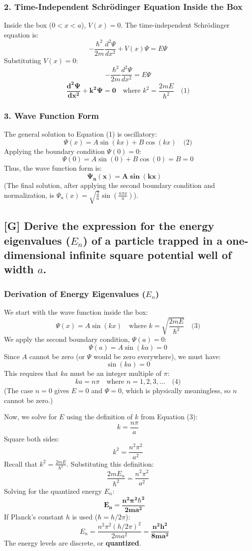 \documentclass[12pt]{article}
\begin{document}
\subsubsection*{2. Time-Independent Schrödinger Equation Inside the Box}
Inside the box ($0 < x < a$), $V(x)=0$. The time-independent Schrödinger equation is:
$$
-\frac{\hbar^2}{2m} \frac{d^2\Psi}{dx^2} + V(x)\Psi = E\Psi
$$
Substituting $V(x)=0$:
$$
-\frac{\hbar^2}{2m} \frac{d^2\Psi}{dx^2} = E\Psi
$$
$$
\mathbf{\frac{d^2\Psi}{dx^2} + k^2\Psi = 0} \quad \text{where } k^2 = \frac{2mE}{\hbar^2} \quad \text{(1)}
$$

\subsubsection*{3. Wave Function Form}
The general solution to Equation (1) is oscillatory:
$$
\Psi(x) = A \sin(kx) + B \cos(kx) \quad \text{(2)}
$$
Applying the boundary condition $\Psi(0)=0$:
$$
\Psi(0) = A \sin(0) + B \cos(0) = B = 0
$$
Thus, the wave function form is:
$$
\mathbf{\Psi_n(x) = A \sin(kx)} \quad \text{}
$$
(The final solution, after applying the second boundary condition and normalization, is $\Psi_n(x) = \sqrt{\frac{2}{a}} \sin\left(\frac{n\pi x}{a}\right)$).

\subsection{[G] Derive the expression for the energy eigenvalues ($E_n$) of a particle trapped in a one-dimensional infinite square potential well of width $a$.}

\subsubsection*{Derivation of Energy Eigenvalues ($E_n$)}
We start with the wave function inside the box:
$$
\Psi(x) = A \sin(kx) \quad \text{where } k = \sqrt{\frac{2mE}{\hbar^2}} \quad \text{(3)}
$$
We apply the second boundary condition, $\Psi(a) = 0$:
$$
\Psi(a) = A \sin(ka) = 0
$$
Since $A$ cannot be zero (or $\Psi$ would be zero everywhere), we must have:
$$
\sin(ka) = 0
$$
This requires that $ka$ must be an integer multiple of $\pi$:
$$
k a = n\pi \quad \text{where } n = 1, 2, 3, \ldots \quad \text{(4)}
$$
(The case $n=0$ gives $E=0$ and $\Psi=0$, which is physically meaningless, so $n$ cannot be zero.)

Now, we solve for $E$ using the definition of $k$ from Equation (3):
$$
k = \frac{n\pi}{a}
$$
Square both sides:
$$
k^2 = \frac{n^2\pi^2}{a^2}
$$
Recall that $k^2 = \frac{2mE}{\hbar^2}$. Substituting this definition:
$$
\frac{2mE_n}{\hbar^2} = \frac{n^2\pi^2}{a^2}
$$
Solving for the quantized energy $E_n$:
$$
\mathbf{E_n = \frac{n^2 \pi^2 \hbar^2}{2ma^2}} \quad \text{}
$$
If Planck's constant $h$ is used ($\hbar = h/2\pi$):
$$
E_n = \frac{n^2 \pi^2 (h/2\pi)^2}{2ma^2} = \mathbf{\frac{n^2 h^2}{8ma^2}} \quad \text{}
$$
The energy levels are discrete, or \textbf{quantized}.
\end{document}
